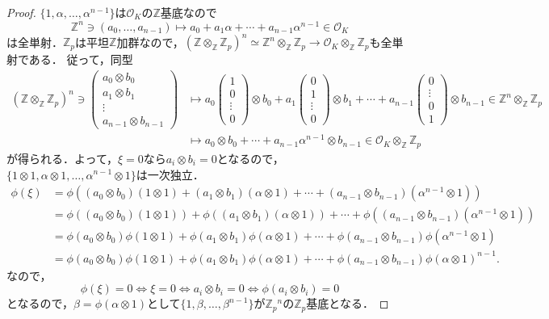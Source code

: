 \begin{proof}
  $\{1, \alpha, \ldots, \alpha^{n-1}\}$は$\mathcal{O}_K$の$\mathbb{Z}$基底なので
  \[ \mathbb{Z}^n \ni (a_0, \ldots, a_{n-1}) \mapsto a_0+a_1\alpha+\cdots+a_{n-1}\alpha^{n-1} \in \mathcal{O}_K \]
  は全単射．$\mathbb{Z}_p$は平坦$\mathbb{Z}$加群なので，$(\mathbb{Z} \otimes_\mathbb{Z} \mathbb{Z}_p)^n \simeq \mathbb{Z}^n \otimes_\mathbb{Z} \mathbb{Z}_p \to \mathcal{O}_K \otimes_\mathbb{Z} \mathbb{Z}_p$も全単射である．
  従って，同型
  \begin{align*}
    (\mathbb{Z} \otimes_\mathbb{Z} \mathbb{Z}_p)^n \ni \begin{pmatrix} a_0 \otimes b_0 \\ a_1 \otimes b_1 \\ \vdots \\ a_{n-1} \otimes b_{n-1} \end{pmatrix} & \mapsto a_0\begin{pmatrix} 1 \\ 0 \\ \vdots \\ 0 \end{pmatrix} \otimes b_0 + a_1\begin{pmatrix} 0 \\ 1 \\ \vdots \\ 0 \end{pmatrix} \otimes b_1 + \cdots + a_{n-1}\begin{pmatrix} 0 \\ \vdots \\ 0 \\ 1 \end{pmatrix} \otimes b_{n-1} \in \mathbb{Z}^n \otimes_\mathbb{Z} \mathbb{Z}_p \\[10pt]
    & \mapsto a_0 \otimes b_0 + \cdots + a_{n-1}\alpha^{n-1} \otimes b_{n-1} \in \mathcal{O}_K \otimes_\mathbb{Z} \mathbb{Z}_p
  \end{align*}
  が得られる．よって，$\xi = 0$なら$a_i \otimes b_i = 0$となるので，$\{1 \otimes 1, \alpha \otimes 1, \ldots, \alpha^{n-1} \otimes 1\}$は一次独立．
  \begin{align*}
    \phi(\xi) &= \phi((a_0 \otimes b_0)(1 \otimes 1)+(a_1 \otimes b_1)(\alpha \otimes 1)+\cdots+(a_{n-1} \otimes b_{n-1})(\alpha^{n-1} \otimes 1))\\
    &= \phi((a_0 \otimes b_0)(1 \otimes 1))+\phi((a_1 \otimes b_1)(\alpha \otimes 1))+\cdots+\phi((a_{n-1} \otimes b_{n-1})(\alpha^{n-1} \otimes 1))\\
    &= \phi(a_0 \otimes b_0)\phi(1 \otimes 1)+\phi(a_1 \otimes b_1)\phi(\alpha \otimes 1)+\cdots+\phi(a_{n-1} \otimes b_{n-1})\phi(\alpha^{n-1} \otimes 1)\\
    &= \phi(a_0 \otimes b_0)\phi(1 \otimes 1)+\phi(a_1 \otimes b_1)\phi(\alpha \otimes 1)+\cdots+\phi(a_{n-1} \otimes b_{n-1})\phi(\alpha \otimes 1)^{n-1}.
  \end{align*}
  なので，
  \[\phi(\xi) = 0 \Leftrightarrow \xi = 0 \Leftrightarrow a_i \otimes b_i = 0 \Leftrightarrow \phi(a_i \otimes b_i)=0\]
  となるので，$\beta=\phi(\alpha \otimes 1)$として$\{1, \beta, \ldots, \beta^{n-1}\}$が$\mathbb{Z}_p{}^n$の$\mathbb{Z}_p$基底となる．
\end{proof}

